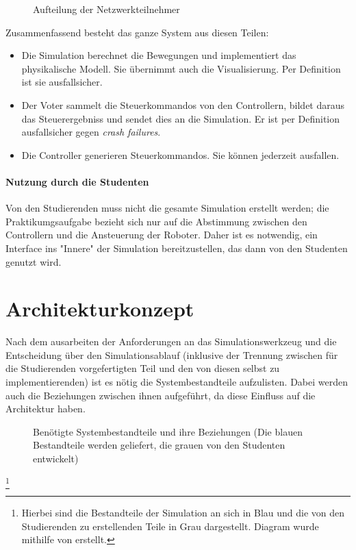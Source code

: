 \begin{figure}
	\centering
	\caption{Aufteilung der Netzwerkteilnehmer}
	\label{fig:network}
\end{figure}

Zusammenfassend besteht das ganze System aus diesen Teilen:
\begin{itemize}
	\item Die Simulation berechnet die Bewegungen und implementiert das physikalische Modell. Sie {\"{u}}bernimmt auch die Visualisierung. Per Definition ist sie ausfallsicher.
	\item Der Voter sammelt die Steuerkommandos von den Controllern, bildet daraus das Steuerergebniss und sendet dies an die Simulation. Er ist per Definition ausfallsicher gegen \textit{crash failures}.
	\item Die Controller generieren Steuerkommandos. Sie k{\"{o}}nnen jederzeit ausfallen.
\end{itemize}

\paragraph{Nutzung durch die Studenten} Von den Studierenden muss nicht die gesamte Simulation erstellt werden;
die Praktikumgsaufgabe bezieht sich nur auf die Abstimmung zwischen den Controllern und die Ansteuerung der Roboter.
Daher ist es notwendig, ein Interface ins "Innere" der Simulation bereitzustellen, das dann von den Studenten genutzt wird.

\clearpage
\section{Architekturkonzept}
Nach dem ausarbeiten der Anforderungen an das Simulationswerkzeug und die Entscheidung {\"{u}}ber den Simulationsablauf (inklusive
der Trennung zwischen f{\"{u}}r die Studierenden vorgefertigten Teil und den von diesen selbst zu implementierenden) ist es n{\"{o}}tig
die Systembestandteile aufzulisten. Dabei werden auch die Beziehungen zwischen ihnen aufgef{\"{u}}hrt, da diese Einfluss auf die
Architektur haben.

\begin{figure}
	\centering
	\caption[Ben{\"{o}}tigte Systembestandteile]{Ben{\"{o}}tigte Systembestandteile und ihre Beziehungen (Die blauen Bestandteile werden geliefert, die grauen von den Studenten entwickelt)}
	\label{fig:arch_pre}
\end{figure}
\footnote{Hierbei sind die Bestandteile der Simulation an sich in Blau und die von den Studierenden zu erstellenden Teile in Grau
dargestellt. Diagram wurde mithilfe von \cite{Hunter:2007} erstellt.}

